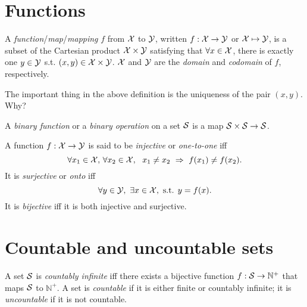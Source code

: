 \section{Functions}
\label{sec:functions}

\begin{defn}
  A \emph{function}/\emph{map}/\emph{mapping} $f$
  from ${\cal X}$ to ${\cal Y}$,
  written $f: {\cal X}\rightarrow {\cal Y}$ or ${\cal X}\mapsto {\cal Y}$,
  is a subset of the Cartesian product ${\cal X} \times {\cal Y}$
  satisfying that
  $\forall x\in {\cal X}$,
  there is exactly one $y\in {\cal Y}$
  s.t. $(x,y)\in {\cal X}\times {\cal Y}$.
  ${\cal X}$ and ${\cal Y}$ are
  the \emph{domain} and \emph{codomain} of $f$,
  respectively.
\end{defn}

\begin{rem}
The important thing in the above definition
 is the uniqueness of the pair $(x,y)$.
Why?
\end{rem}

\begin{defn}
  A \emph{binary function} or a \emph{binary operation} on a set ${\cal S}$
  is a map \mbox{${\cal S}\times{\cal S} \rightarrow {\cal S}$}.
\end{defn}

\begin{defn}
  A function $f:{\cal X}\rightarrow {\cal Y}$ is said to be
  \emph{injective} or \emph{one-to-one} iff
   \begin{equation}
     \forall x_1\in {\cal X},\, \forall x_2\in {\cal X},\ \ 
     x_1\ne x_2 \ \Rightarrow\ f(x_1)\ne f(x_2).
   \end{equation}
  It is \emph{surjective} or \emph{onto} iff
   \begin{equation}
     \forall y\in {\cal Y},\ \exists x\in {\cal X}, \text{ s.t. }
     y=f(x).
   \end{equation}
  It is \emph{bijective} iff it is both injective and surjective.
\end{defn}


\section{Countable and uncountable sets}
\label{sec:count-unco-sets}

\begin{defn}
  \label{def:countability}
  A set ${\cal S}$ is \emph{countably infinite}
   iff there exists a bijective function
   $f:{\cal S}\rightarrow \mathbb{N}^+$
   that maps ${\cal S}$ to $\mathbb{N}^+$.
  A set is \emph{countable}
  if it is either finite or countably infinite;
  it is \emph{uncountable}
  if it is not countable.
\end{defn}

